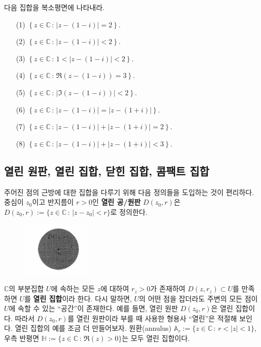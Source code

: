 \begin{salt_exercise} \label{ex-1-23}
다음 집합을 복소평면에 나타내라.
\begin{itemize}
\item[(1)] $\left\{z\in\mathbb C\,:\, |z-(1-i)| = 2 \right\}$.
\item[(2)] $\left\{z\in\mathbb C\,:\, |z-(1-i)| < 2 \right\}$.
\item[(3)] $\left\{z\in\mathbb C\,:\, 1< |z-(1-i)| < 2 \right\}$.
\item[(4)] $\left\{z\in\mathbb C\,:\, \Re(z-(1-i)) = 3 \right\}$.
\item[(5)] $\left\{z\in\mathbb C\,:\, |\Im(z-(1-i))| < 2 \right\}$.
\item[(6)] $\left\{z\in\mathbb C\,:\, |z-(1-i)| = |z-(1+i)| \right\}$.
\item[(7)] $\left\{z\in\mathbb C\,:\, |z-(1-i)| + |z-(1+i)| = 2 \right\}$.
\item[(8)] $\left\{z\in\mathbb C\,:\, |z-(1-i)| + |z-(1+i)| < 3 \right\}$.
\end{itemize}
\end{salt_exercise}

\subsection{열린 원판, 열린 집합, 닫힌 집합, 콤팩트 집합}

주어진 점의 근방에 대한 집합을 다루기 위해 다음 정의들을 도입하는 것이 편리하다.
중심이 $z_0$이고 반지름이 $r>0$인 {\bf 열린 공/원판} $D(z_0,r)$은 
$D(z_0,r) :=\{ z\in\mathbb C \,:\, |z-z_0| <r \}$로 정의한다.

\begin{figure}[!h]
\begin{center}
\includegraphics[width=0.3\textwidth]{./SaltChapter/fig-1-0-1}
\end{center}
\end{figure}

$\mathbb C$의 부분집합 $U$에 속하는
모든 $z$에 대하여 $r_z>0$가 존재하여 $D(z,r_z)\subset U$를 만족하면
$U$를 {\bf 열린 집합}이라 한다.
다시 말하면, $U$의 어떤 점을 잡더라도 
주변의 모든 점이 $U$에 속할 수 있는 ``공간''이 존재한다.
예를 들면, 열린 원판 $D(z_0,r)$은 열린 집합이다.
따라서  $D(z_0,r)$를 열린 원판이라 부를 때 사용한 형용사 ``열린''은 적절해 보인다.
열린 집합의 예를 조금 더 만들어보자.
원환(annulus) $\mathbb A_r := \{ z\in\mathbb C\,:\, r<|z|<1\}$,
우측 반평면 $\mathbb H:= \{z\in\mathbb C\,:\, \Re(z)>0\}$는 모두 열린 집합이다.

